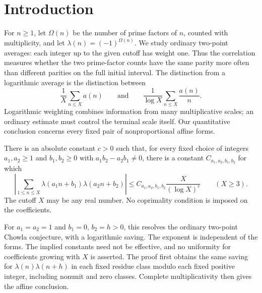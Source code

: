 \begin{abstract}
We prove the ordinary two-point Chowla conjecture. For every fixed pair
of nonproportional affine forms, the Liouville correlation has a
power-of-logarithm saving at every cutoff, with an absolute exponent.
We also prove the binary corrected Elliott conjecture for ordinary
averages of complex multiplicative functions of modulus at most one,
under uniform nonpretentiousness of at least one original factor.
This qualitative conclusion holds in fixed residue classes and for
fixed nonproportional affine forms.
\end{abstract}

\section{Introduction}\label{sec:introduction}

For \(n\ge1\), let \(\Omega(n)\) be the number of prime factors of \(n\),
counted with multiplicity, and let \(\lambda(n)=(-1)^{\Omega(n)}\).
We study ordinary two-point averages: each integer up to the given
cutoff has weight one. Thus the correlation measures whether the two prime-factor counts
have the same parity more often than different parities on the full
initial interval.
The distinction from a logarithmic average is the distinction between
\[
 \frac1X\sum_{n\le X}a(n)
 \qquad\text{and}\qquad
 \frac1{\log X}\sum_{n\le X}\frac{a(n)}n.
\]
Logarithmic weighting combines information from many multiplicative
scales; an ordinary estimate must control the terminal scale itself.
Our quantitative conclusion concerns every fixed pair of
nonproportional affine forms.

\begin{theorem}
\label{thm:q-affine}
There is an absolute constant \(c>0\) such that, for every fixed choice
of integers \(a_1,a_2\ge1\) and \(b_1,b_2\ge0\) with
\(a_1b_2-a_2b_1\ne0\), there is a constant
\(C_{a_1,a_2,b_1,b_2}\) for which
\[
 \left|\sum_{1\le n\le X}
       \lambda(a_1n+b_1)\lambda(a_2n+b_2)\right|
 \le C_{a_1,a_2,b_1,b_2}\frac{X}{(\log X)^c}
 \qquad(X\ge3).
\]
The cutoff \(X\) may be any real number. No coprimality condition is
imposed on the coefficients.
\end{theorem}

For $a_1=a_2=1$ and $b_1=0$, $b_2=h>0$, this resolves the
ordinary two-point Chowla conjecture, with a logarithmic saving.
The exponent is independent of the forms. The implied constants need
not be effective, and no uniformity for coefficients growing with \(X\)
is asserted. The proof first obtains the same saving for
\(\lambda(n)\lambda(n+h)\) in each fixed residue class modulo each fixed
positive integer, including nonunit and zero classes. Complete
multiplicativity then gives the affine conclusion.

